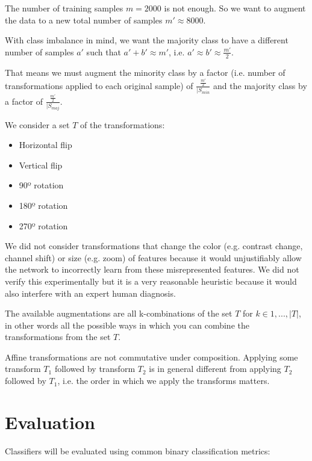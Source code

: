 The number of training samples $m = 2000$ is not enough. So we want to augment the data to a new total number of samples $m' \approx 8000$.

With class imbalance in mind, we want the majority class to have a different number of samples $a'$ such that $a' + b' \approx m'$, i.e. $a' \approx b' \approx \frac{m'}{2}$.

That means we must augment the minority class by a factor (i.e. number of transformations applied to each original sample) of $\frac{\frac{m'}{2}}{|S_{min}}$ and the majority class by a factor of $\frac{\frac{m'}{2}}{|S_{maj}}$.

We consider a set $T$ of the transformations:

\begin{itemize}
    \item Horizontal flip
    \item Vertical flip
    \item 90º rotation
    \item 180º rotation
    \item 270º rotation
\end{itemize}

We did not consider transformations that change the color (e.g. contrast change, channel shift) or size (e.g. zoom) of features because it would unjustifiably allow the network to incorrectly learn from these misrepresented features. We did not verify this experimentally but it is a very reasonable heuristic because it would also interfere with an expert human diagnosis.

The available augmentations are all k-combinations of the set $T$ for $k \in {1, ..., |T|}$, in other words all the possible ways in which you can combine the transformations from the set $T$.

Affine transformations are not commutative under composition. Applying some transform $T_1$ followed by transform $T_2$ is in general different from applying $T_2$ followed by $T_1$, i.e. the order in which we apply the transforms matters.

\section{Evaluation}

Classifiers will be evaluated using common binary classification metrics:

